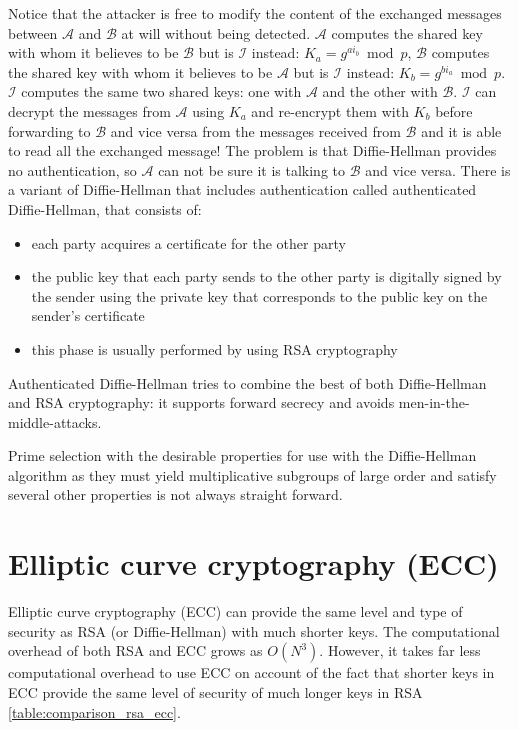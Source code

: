 Notice that the attacker is free to modify the content of the exchanged messages between $\mathcal{A}$ and $\mathcal{B}$ at will without being detected.
$\mathcal{A}$ computes the shared key with whom it believes to be $\mathcal{B}$ but is $\mathcal{I}$ instead: $K_a = g^{a i_b} \bmod p$, $\mathcal{B}$ computes the shared key with whom it believes to be $\mathcal{A}$ but is $\mathcal{I}$ instead: $K_b = g^{b i_a} \bmod p$. $\mathcal{I}$ computes the same two shared keys: one with $\mathcal{A}$ and the other with $\mathcal{B}$. $\mathcal{I}$ can decrypt the messages from $\mathcal{A}$ using $K_a$ and re-encrypt them with $K_b$ before forwarding to $\mathcal{B}$ and vice versa from the messages received from $\mathcal{B}$ and it is able to read all the exchanged message!
The problem is that Diffie-Hellman provides no authentication, so $\mathcal{A}$ can not be sure it is talking to $\mathcal{B}$ and vice versa. There is a variant of Diffie-Hellman that includes authentication called authenticated Diffie-Hellman, that consists of:
\begin{itemize}
	\item each party acquires a certificate for the other party
	\item the public key that each party sends to the other party is digitally signed by the sender 	using the private key that corresponds to the public key on the sender’s certificate
	\item this phase is usually performed by using RSA cryptography
\end{itemize}

Authenticated Diffie-Hellman tries to combine the best of both Diffie-Hellman and RSA cryptography: it supports forward secrecy and avoids men-in-the-middle-attacks.

Prime selection with the desirable properties for use with the Diffie-Hellman algorithm as they must yield multiplicative subgroups of large order and satisfy several other properties is not always straight forward.

\section{Elliptic curve cryptography (ECC)}

Elliptic curve cryptography (ECC) can provide the same level and type of security as RSA (or Diffie-Hellman) with much shorter keys. The computational overhead of both RSA and ECC grows as $O(N^3)$. However, it takes far less computational overhead to use ECC on account of the fact that shorter keys in ECC provide the same level of security of much longer keys in RSA \ref{table:comparison_rsa_ecc}.

